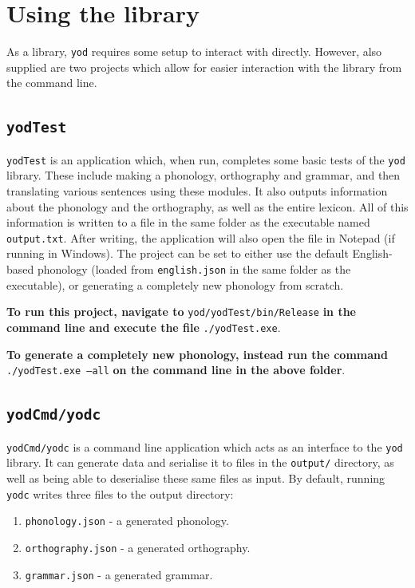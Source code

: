 \documentclass{report}
\begin{document}
   \section{Using the library}
   As a library, \texttt{yod} requires some setup to interact with directly. However, also supplied are two projects which allow for easier interaction with the library from the command line.
   
   \subsection{\texttt{yodTest}}
   \texttt{yodTest} is an application which, when run, completes some basic tests of the \texttt{yod} library. These include making a phonology, orthography and grammar, and then translating various sentences using these modules. It also outputs information about the phonology and the orthography, as well as the entire lexicon. All of this information is written to a file in the same folder as the executable named \texttt{output.txt}. After writing, the application will also open the file in Notepad (if running in Windows). The project can be set to either use the default English-based phonology (loaded from \texttt{english.json} in the same folder as the executable), or generating a completely new phonology from scratch.
   
   \textbf{To run this project, navigate to} \texttt{yod/yodTest/bin/Release} \textbf{in the command line and execute the file} \texttt{./yodTest.exe}.
   
   \textbf{To generate a completely new phonology, instead run the command} \texttt{./yodTest.exe --all} \textbf{on the command line in the above folder}.
   
   \subsection{\texttt{yodCmd/yodc}}
   	
   \texttt{yodCmd/yodc} is a command line application which acts as an interface to the \texttt{yod} library. It can generate data and serialise it to files in the \texttt{output/} directory, as well as being able to deserialise these same files as input. By default, running \texttt{yodc} writes three files to the output directory:
   \begin{enumerate}
   	\item \texttt{phonology.json} - a generated phonology.
   	\item \texttt{orthography.json} - a generated orthography.
   	\item \texttt{grammar.json} - a generated grammar.
   \end{enumerate}
\end{document}
